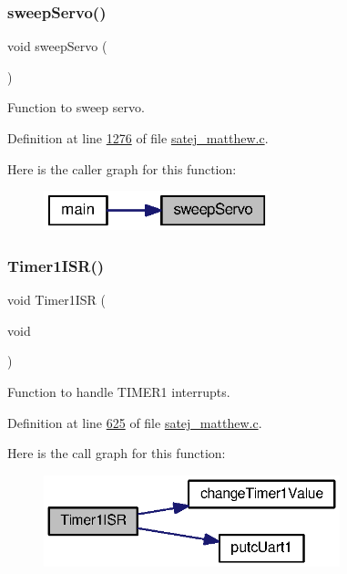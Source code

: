 \subsubsection{\texorpdfstring{sweepServo()}{sweepServo()}}
{\footnotesize\ttfamily void sweep\+Servo (\begin{DoxyParamCaption}{ }\end{DoxyParamCaption})}



Function to sweep servo. 



Definition at line \mbox{\hyperlink{satej__matthew_8c_source_l01276}{1276}} of file \mbox{\hyperlink{satej__matthew_8c_source}{satej\+\_\+matthew.\+c}}.

Here is the caller graph for this function\+:\nopagebreak
\begin{figure}[H]
\begin{center}
\leavevmode
\includegraphics[width=186pt]{satej__matthew_8c_a086130ac68735e2ba8d56b2dfe45b914_icgraph}
\end{center}
\end{figure}
\mbox{\label{satej__matthew_8c_a7829469bbaa6a5d7e77e19e1d55b673e}} 
\subsubsection{\texorpdfstring{Timer1ISR()}{Timer1ISR()}}
{\footnotesize\ttfamily void Timer1\+I\+SR (\begin{DoxyParamCaption}\item[{void}]{ }\end{DoxyParamCaption})}



Function to handle T\+I\+M\+E\+R1 interrupts. 



Definition at line \mbox{\hyperlink{satej__matthew_8c_source_l00625}{625}} of file \mbox{\hyperlink{satej__matthew_8c_source}{satej\+\_\+matthew.\+c}}.

Here is the call graph for this function\+:\nopagebreak
\begin{figure}[H]
\begin{center}
\leavevmode
\includegraphics[width=244pt]{satej__matthew_8c_a7829469bbaa6a5d7e77e19e1d55b673e_cgraph}
\end{center}
\end{figure}
\mbox{\label{satej__matthew_8c_af0a12620be9cfe02c43ff4c8d6556fe2}} 
